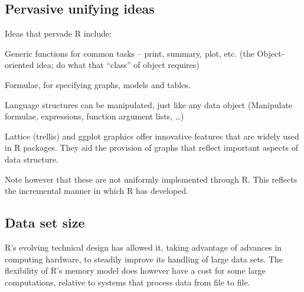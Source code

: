 \subsection*{Pervasive unifying ideas}
Ideas that pervade R include:\\[-8pt]
\begin{list}{}{\setlength{\itemsep}{1pt} \setlength{\parsep}{1pt}}
\item[] Generic functions for common tasks -- print, summary, plot, etc.
(the Object-oriented idea; do what that ``class'' of object requires)

\item[] Formulae, for specifying graphs, models and tables.

\item[] Language structures can be manipulated, just like any
data object (Manipulate formulae, expressions, function argument
lists, \dots)

\item[] Lattice (trellis) and ggplot graphics offer innovative
  features that are widely used in R packages.  They aid the provision
  of graphs that reflect important aspects of data structure.

\end{list}
Note however that these are not uniformly implemented through R.
This reflects the incremental manner in which R has developed.

\subsection*{Data set size}
R's evolving technical design has allowed it, taking advantage of advances in computing hardware,
to steadily improve its handling of large data sets. The flexibility
of R's memory model does however have a cost for some large computations, relative to systems
that process data from file to file.

